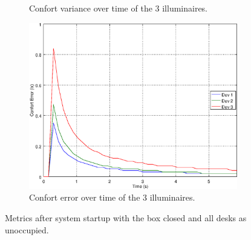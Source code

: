 \begin{figure}[ht]
\begin{subfigure}[t]{0.3\textwidth}
    \caption{Confort variance over time of the 3 illuminaires.}
    \label{fig:f_closed_o000}
    \end{subfigure}
    \begin{subfigure}[t]{0.3\textwidth}
    \centering
    \includegraphics[width=.95\textwidth]{img/n_closed_o000}
    \caption{Confort error over time of the 3 illuminaires.}
    \label{fig:n_closed_o000}
    \end{subfigure}
    \caption{Metrics after system startup with the box closed and all desks as unoccupied. }
\end{figure}


